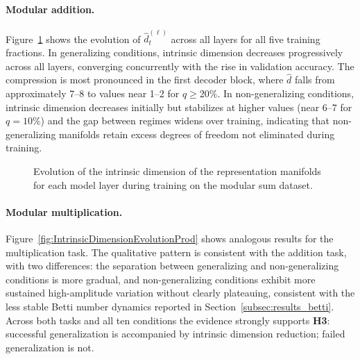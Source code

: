 \paragraph{Modular addition.}
Figure~\ref{fig:IntrinsicDimensionEvolutionSum} shows the evolution of $\hat{d}^{(\ell)}_t$ across all layers for all five training fractions. In generalizing conditions, intrinsic dimension decreases progressively across all layers, converging concurrently with the rise in validation accuracy. The compression is most pronounced in the first decoder block, where $\hat{d}$ falls from approximately 7--8 to values near 1--2 for $q \geq 20\%$. In non-generalizing conditions, intrinsic dimension decreases initially but stabilizes at higher values  (near 6--7 for $q = 10\%$) and the gap between regimes widens over training, indicating that non-generalizing manifolds retain excess degrees of freedom not eliminated during training.

\begin{figure}[H]
	\centering
	 
	 
	 
	\caption[Intrinsic dimension evolution (Modular Sum).]{Evolution of the intrinsic dimension of the representation manifolds for each model layer during training on the modular sum dataset.}
	\label{fig:IntrinsicDimensionEvolutionSum}
\end{figure}


\paragraph{Modular multiplication.}
Figure~\ref{fig:IntrinsicDimensionEvolutionProd} shows analogous results for the multiplication task. The qualitative pattern is consistent with the addition task, with two differences: the separation between generalizing and non-generalizing conditions is more gradual, and non-generalizing conditions exhibit more sustained high-amplitude variation without clearly plateauing, consistent with the less stable Betti number dynamics reported in Section~\ref{subsec:results_betti}. Across both tasks and all ten conditions the evidence strongly supports \textbf{H3}: successful generalization is accompanied by intrinsic dimension reduction; failed generalization is not. %

